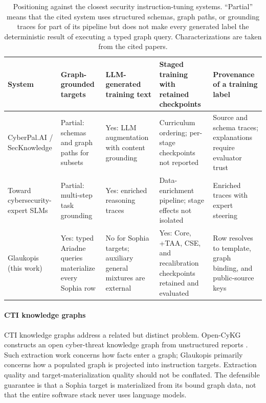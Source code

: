 \documentclass[preprint,12pt,authoryear]{elsarticle}
\begin{document}
\begin{table}[!htbp]
\centering\footnotesize
\caption{Positioning against the closest security instruction-tuning systems. ``Partial'' means that the cited system uses structured schemas, graph paths, or grounding traces for part of its pipeline but does not make every generated label the deterministic result of executing a typed graph query. Characterizations are taken from the cited papers.}\label{tab:positioning}
\begin{tabularx}{\textwidth}{@{}p{2.6cm}XXXX@{}}
\toprule
System & Graph-grounded targets & LLM-generated training text & Staged training with retained checkpoints & Provenance of a training label \\
\midrule
CyberPal.AI / SecKnowledge \citep{levi2025cyberpal} & Partial: schemas and graph paths for subsets & Yes: LLM augmentation with content grounding & Curriculum ordering; per-stage checkpoints not reported & Source and schema traces; explanations require evaluator trust \\
Toward cybersecurity-expert SLMs \citep{levi2025toward} & Partial: multi-step task grounding & Yes: enriched reasoning traces & Data-enrichment pipeline; stage effects not isolated & Enriched traces with expert steering \\
Glaukopis (this work) & Yes: typed Ariadne queries materialize every Sophia row & No for Sophia targets; auxiliary general mixtures are external & Yes: Core, +TAA, CSE, and recalibration checkpoints retained and evaluated & Row resolves to template, graph binding, and public-source keys \\
\bottomrule
\end{tabularx}
\end{table}

\paragraph{CTI knowledge graphs}
CTI knowledge graphs address a related but distinct problem. Open-CyKG constructs an open cyber-threat knowledge graph from unstructured reports \citep{sarhan2021opencykg}. Such extraction work concerns how facts enter a graph; Glaukopis primarily concerns how a populated graph is projected into instruction targets. Extraction quality and target-materialization quality should not be conflated. The defensible guarantee is that a Sophia target is materialized from its bound graph data, not that the entire software stack never uses language models.
\end{document}
